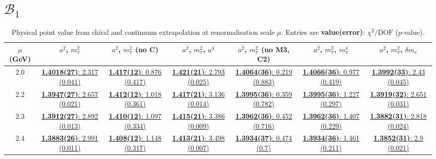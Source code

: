 \documentclass[12pt]{extarticle}
\begin{document}
\section{$\mathcal{B}_1$}
\begin{table}[h!]
\begin{center}
\begin{tabular}{|c|c|c|c|c|c|c|}
\hline
$\mu$ (GeV) & $a^2$, $m_\pi^2$& $a^2$, $m_\pi^2$ (no C)& $a^2$, $m_\pi^2$, $a^4$& $a^2$, $m_\pi^2$ (no M3, C2)& $a^2$, $m_\pi^2$, $m_\pi^4$& $a^2$, $m_\pi^2$, $\delta m_s$\\
\hline
2.0& \hyperlink{VVpAA/NPR/a2m2_20.pdf.1}{\textbf{1.4018(27)}: 2.317 (0.041)} & \hyperlink{VVpAA/NPR/a2m2noC_20.pdf.1}{\textbf{1.417(12)}: 0.876 (0.417)} & \hyperlink{VVpAA/NPR/a2a4m2_20.pdf.1}{\textbf{1.421(21)}: 2.793 (0.025)} & \hyperlink{VVpAA/NPR/a2m2mcut_20.pdf.1}{\textbf{1.4064(36)}: 0.219 (0.883)} & \hyperlink{VVpAA/NPR/a2m2m4_20.pdf.1}{\textbf{1.4066(36)}: 0.977 (0.419)} & \hyperlink{VVpAA/NPR/a2m2delm_20.pdf.1}{\textbf{1.3992(33)}: 2.43 (0.045)}\\
2.2& \hyperlink{VVpAA/NPR/a2m2_22.pdf.1}{\textbf{1.3947(27)}: 2.657 (0.021)} & \hyperlink{VVpAA/NPR/a2m2noC_22.pdf.1}{\textbf{1.412(12)}: 1.018 (0.361)} & \hyperlink{VVpAA/NPR/a2a4m2_22.pdf.1}{\textbf{1.417(21)}: 3.136 (0.014)} & \hyperlink{VVpAA/NPR/a2m2mcut_22.pdf.1}{\textbf{1.3995(36)}: 0.359 (0.782)} & \hyperlink{VVpAA/NPR/a2m2m4_22.pdf.1}{\textbf{1.3995(36)}: 1.227 (0.297)} & \hyperlink{VVpAA/NPR/a2m2delm_22.pdf.1}{\textbf{1.3919(32)}: 2.651 (0.031)}\\
2.3& \hyperlink{VVpAA/NPR/a2m2_23.pdf.1}{\textbf{1.3912(27)}: 2.892 (0.013)} & \hyperlink{VVpAA/NPR/a2m2noC_23.pdf.1}{\textbf{1.410(12)}: 1.097 (0.334)} & \hyperlink{VVpAA/NPR/a2a4m2_23.pdf.1}{\textbf{1.415(21)}: 3.386 (0.009)} & \hyperlink{VVpAA/NPR/a2m2mcut_23.pdf.1}{\textbf{1.3962(36)}: 0.452 (0.716)} & \hyperlink{VVpAA/NPR/a2m2m4_23.pdf.1}{\textbf{1.3962(36)}: 1.407 (0.229)} & \hyperlink{VVpAA/NPR/a2m2delm_23.pdf.1}{\textbf{1.3882(31)}: 2.818 (0.024)}\\
2.4& \hyperlink{VVpAA/NPR/a2m2_24.pdf.1}{\textbf{1.3883(26)}: 2.991 (0.011)} & \hyperlink{VVpAA/NPR/a2m2noC_24.pdf.1}{\textbf{1.408(12)}: 1.148 (0.317)} & \hyperlink{VVpAA/NPR/a2a4m2_24.pdf.1}{\textbf{1.413(21)}: 3.498 (0.007)} & \hyperlink{VVpAA/NPR/a2m2mcut_24.pdf.1}{\textbf{1.3934(37)}: 0.474 (0.7)} & \hyperlink{VVpAA/NPR/a2m2m4_24.pdf.1}{\textbf{1.3934(36)}: 1.461 (0.211)} & \hyperlink{VVpAA/NPR/a2m2delm_24.pdf.1}{\textbf{1.3852(31)}: 2.9 (0.021)}\\
\hline
\end{tabular}
\caption{Physical point value from chiral and continuum extrapolation at renormalisation scale $\mu$. Entries are \textbf{value(error)}: $\chi^2/\text{DOF}$ ($p$-value).}
\end{center}
\end{table}
\end{document}
